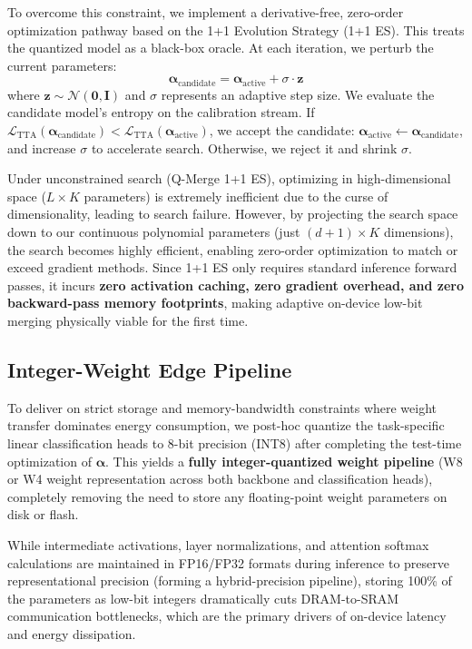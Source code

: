 To overcome this constraint, we implement a derivative-free, zero-order optimization pathway based on the 1+1 Evolution Strategy (1+1 ES). This treats the quantized model as a black-box oracle. At each iteration, we perturb the current parameters:
\begin{equation}
\boldsymbol{\alpha}_{\text{candidate}} = \boldsymbol{\alpha}_{\text{active}} + \sigma \cdot \mathbf{z}
\end{equation}
where $\mathbf{z} \sim \mathcal{N}(\mathbf{0}, \mathbf{I})$ and $\sigma$ represents an adaptive step size. We evaluate the candidate model's entropy on the calibration stream. If $\mathcal{L}_{\text{TTA}}(\boldsymbol{\alpha}_{\text{candidate}}) < \mathcal{L}_{\text{TTA}}(\boldsymbol{\alpha}_{\text{active}})$, we accept the candidate: $\boldsymbol{\alpha}_{\text{active}} \leftarrow \boldsymbol{\alpha}_{\text{candidate}}$, and increase $\sigma$ to accelerate search. Otherwise, we reject it and shrink $\sigma$.

Under unconstrained search (Q-Merge 1+1 ES), optimizing in high-dimensional space ($L \times K$ parameters) is extremely inefficient due to the curse of dimensionality, leading to search failure. However, by projecting the search space down to our continuous polynomial parameters (just $(d+1) \times K$ dimensions), the search becomes highly efficient, enabling zero-order optimization to match or exceed gradient methods. Since 1+1 ES only requires standard inference forward passes, it incurs \textbf{zero activation caching, zero gradient overhead, and zero backward-pass memory footprints}, making adaptive on-device low-bit merging physically viable for the first time.

\subsection{Integer-Weight Edge Pipeline}
To deliver on strict storage and memory-bandwidth constraints where weight transfer dominates energy consumption, we post-hoc quantize the task-specific linear classification heads to 8-bit precision (INT8) after completing the test-time optimization of $\boldsymbol{\alpha}$. This yields a \textbf{fully integer-quantized weight pipeline} (W8 or W4 weight representation across both backbone and classification heads), completely removing the need to store any floating-point weight parameters on disk or flash. 

While intermediate activations, layer normalizations, and attention softmax calculations are maintained in FP16/FP32 formats during inference to preserve representational precision (forming a hybrid-precision pipeline), storing 100\% of the parameters as low-bit integers dramatically cuts DRAM-to-SRAM communication bottlenecks, which are the primary drivers of on-device latency and energy dissipation. 

